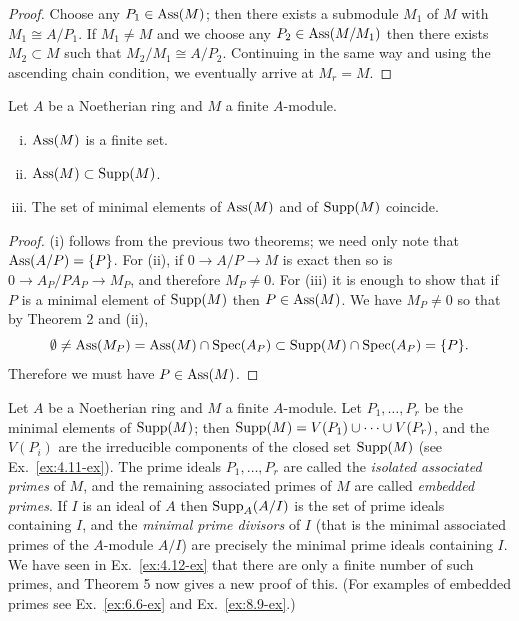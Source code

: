 \begin{proof}
Choose any $P_1 \in \operatorname{Ass}(M)$; then there exists a submodule $M_1$ of $M$
with $M_1 \cong A/P_1$. If $M_1 \neq M$ and we choose any $P_2 \in \operatorname{Ass}(M/M_1)$ then
there exists $M_2 \subset M$ such that $M_2/M_1 \cong A/P_2$. Continuing in the same way and
using the ascending chain condition, we eventually arrive at $M_r = M$.
\end{proof}

\begin{theorem}\label{thm:6.5}
Let $A$ be a Noetherian ring and $M$ a finite $A$-module.
\begin{enumerate}[(i)]
  \item $\operatorname{Ass}(M)$ is a finite set.
  \item $\operatorname{Ass}(M) \subset \operatorname{Supp}(M)$.
  \item The set of minimal elements of $\operatorname{Ass}(M)$ and of $\operatorname{Supp}(M)$ coincide.
\end{enumerate}
\end{theorem}

\begin{proof}
(i) follows from the previous two theorems; we need only note
that $\operatorname{Ass}(A/P) = \{P\}$. For (ii), if $0 \to A/P \to M$ is exact then so is $0 \to
A_P/PA_P \to M_P$, and therefore $M_P \neq 0$. For (iii) it is enough to show that
if $P$ is a minimal element of $\operatorname{Supp}(M)$ then $P \in \operatorname{Ass}(M)$. We have $M_P \neq 0$
so that by Theorem 2 and (ii),
\[
  \emptyset \neq \operatorname{Ass}(M_P) = \operatorname{Ass}(M) \cap \operatorname{Spec}(A_P) \subset \operatorname{Supp}(M) \cap \operatorname{Spec}(A_P)
             = \{P\}.
\]
Therefore we must have $P \in \operatorname{Ass}(M)$.
\end{proof}

Let $A$ be a Noetherian ring and $M$ a finite $A$-module. Let $P_1, \ldots, P_r$ be the
minimal elements of $\operatorname{Supp}(M)$; then $\operatorname{Supp}(M) = V(P_1) \cup \cdots \cup V(P_r)$, and the
$V(P_i)$ are the irreducible components of the closed set $\operatorname{Supp}(M)$ (see
Ex.~\ref{ex:4.11-ex}). The prime ideals $P_1, \ldots, P_r$ are called the \emph{isolated associated primes}
of $M$, and the remaining associated primes of $M$ are called \emph{embedded}
\emph{primes}. If $I$ is an ideal of $A$ then $\operatorname{Supp}_A(A/I)$ is the set of prime ideals
containing $I$, and the \emph{minimal prime divisors} of $I$ (that is the minimal
associated primes of the $A$-module $A/I$) are precisely the minimal prime
ideals containing $I$. We have seen in Ex.~\ref{ex:4.12-ex} that there are only a finite
number of such primes, and Theorem 5 now gives a new proof of this.
(For examples of embedded primes see Ex.~\ref{ex:6.6-ex} and Ex.~\ref{ex:8.9-ex}.)

